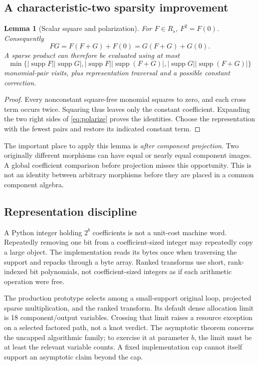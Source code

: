 \documentclass[11pt]{article}
\newtheorem{lemma}[theorem]{Lemma}
\theoremstyle{definition}\newtheorem{definition}[theorem]{Definition}
\theoremstyle{remark}\newtheorem{remark}[theorem]{Remark}
\newcommand{\supp}{\operatorname{supp}}
\begin{document}
\subsection{A characteristic-two sparsity improvement}
\begin{lemma}[Scalar square and polarization]\label{lem:polarization}
For $F\in R_s$, $F^2=F(0)$. Consequently
\begin{equation}\label{eq:polarize}
 FG=F(F+G)+F(0)=G(F+G)+G(0).
\end{equation}
A sparse product can therefore be evaluated using at most
\[
 \min\{|\supp F||\supp G|,
        |\supp F||\supp(F+G)|,
        |\supp G||\supp(F+G)|\}
\]
monomial-pair visits, plus representation traversal and a possible constant correction.
\end{lemma}
\begin{proof}
Every nonconstant square-free monomial squares to zero, and each cross term occurs twice. Squaring thus leaves only the constant coefficient. Expanding the two right sides of \eqref{eq:polarize} proves the identities. Choose the representation with the fewest pairs and restore its indicated constant term.
\end{proof}

The important place to apply this lemma is \emph{after component projection}. Two originally different morphisms can have equal or nearly equal component images. A global coefficient comparison before projection misses this opportunity. This is not an identity between arbitrary morphisms before they are placed in a common component algebra.

\subsection{Representation discipline}
A Python integer holding $2^b$ coefficients is not a unit-cost machine word. Repeatedly removing one bit from a coefficient-sized integer may repeatedly copy a large object. The implementation reads its bytes once when traversing the support and repacks through a byte array. Ranked transforms use short, rank-indexed bit polynomials, not coefficient-sized integers as if each arithmetic operation were free.

The production prototype selects among a small-support original loop, projected sparse multiplication, and the ranked transform. Its default dense allocation limit is 18 component/output variables. Crossing that limit raises a resource exception on a selected factored path, not a knot verdict. The asymptotic theorem concerns the uncapped algorithmic family; to exercise it at parameter $b$, the limit must be at least the relevant variable counts. A fixed implementation cap cannot itself support an asymptotic claim beyond the cap.
\end{document}
